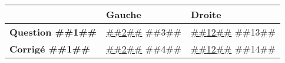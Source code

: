 \documentclass[a4paper,11pt]{article}
\begin{document}
\begin{longtable}{|p{3cm}|p{7.5cm}|p{7.5cm}|}
\hline 
 & Gauche & Droite \\
 

\hline 
\textbf{Question ##{{1}}##} & \underline{##{{2}}##} \newline ##{{3}}## & \underline{##{{12}}##} \newline ##{{13}}## \\



\hline 
\textbf{Corrigé ##{{1}}##} & \underline{##{{2}}##} \newline ##{{4}}## & \underline{##{{12}}##} \newline ##{{14}}## \\


 
\hline 
\end{longtable} 
\end{document}
